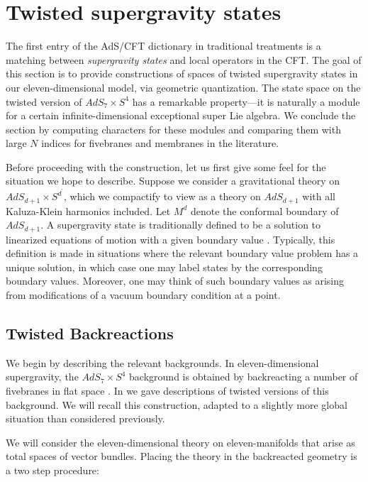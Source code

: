 %
%
%

\section{Twisted supergravity states}
\label{sec:states}

The first entry of the AdS/CFT dictionary in traditional treatments is a matching between \textit{supergravity states} and local operators in the CFT.
The goal of this section is to provide constructions of spaces of twisted supergravity states in our eleven-dimensional model, via geometric quantization. 
The state space on the twisted version of $AdS_{7}\times S^{4}$ has a remarkable property---it is naturally a module for a certain infinite-dimensional exceptional super Lie algebra. 
We conclude the section by computing characters for these modules and comparing them with large $N$ indices for fivebranes and membranes in the literature.

Before proceeding with the construction, let us first give some feel for the situation we hope to describe.
Suppose we consider a gravitational theory on $AdS_{d+1}\times S^{d^{\prime}}$, which we compactify to view as a theory on $AdS_{d+1}$ with all Kaluza-Klein harmonics included. Let $M^{d}$ denote the conformal boundary of $AdS_{d+1}$. A supergravity state is traditionally defined to be a solution to linearized equations of motion with a given boundary value \cite{WittenAdS}. 
Typically, this definition is made in situations where the relevant boundary value problem has a unique solution, in which case one may label states by the corresponding boundary values. Moreover, one may think of such boundary values as arising from modifications of a vacuum boundary condition at a point.


\subsection{Twisted Backreactions}
We begin by describing the relevant backgrounds. In eleven-dimensional supergravity, the $AdS_7 \times S^4$ background is obtained by backreacting a number of fivebranes in flat space \cite{Maldacena:1997re,WittenAdS}.
In \cite{RSW} we gave descriptions of twisted versions of this background. We will recall this construction, adapted to a slightly more global situation than considered previously.

We will consider the eleven-dimensional theory on eleven-manifolds that arise as total spaces of vector bundles. Placing the theory in the backreacted geometry is a two step procedure:

